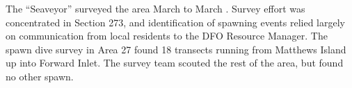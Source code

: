 The ``Seaveyor'' surveyed the area March  to March .
Survey effort was concentrated in Section 273, and identification of spawning events relied largely on communication from local residents to the DFO Resource Manager.
The spawn dive survey in Area 27 found 18 transects running from Matthews Island up into Forward Inlet.
The survey team scouted the rest of the area, but found no other spawn.

